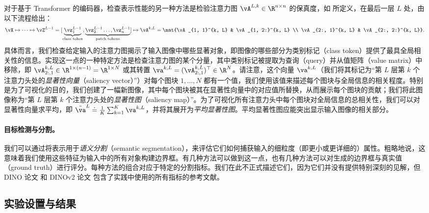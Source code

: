 \documentclass[../../book-main_zh.tex]{subfiles}
\begin{document}
对于基于 Transformer 的编码器，检查表示性能的另一种方法是检验注意力图 \(\vA^{L, k} \in \R^{n \times n}\) 的保真度，如  所定义，在最后一层 \(L\) 处，由以下流程给出：
\begin{align}
\vX \mapsto \cdots \mapsto \vZ^{L - 1} = [\underbrace{\vz_{1}^{L -
    1}}_{\text{class token}}, \underbrace{\vz_{2}^{L - 1} \dots,
\vz_{n}^{L - 1}}_{\text{patch tokens}}] \mapsto \vA^{k, L} =
\mat{\vA_{1, 1}^{k, L} & \vA_{1, 2:}^{k, L} \\ \vA_{2:, 1}^{k, L} &
\vA_{2:, 2:}^{k, L}}.
\end{align}
具体而言，我们检查给定输入的注意力图揭示了输入图像中哪些显著对象，即图像的哪些部分为类别标记（class token）提供了最具全局相关性的信息。实现这一点的一种特定方法是检查注意力图的某个分量，其中类别标记被提取为查询（query）并从值矩阵（value matrix）中移除，即 \(\vA_{2:, 1}^{k, L} \in \R^{1 \times (n - 1)} = \R^{1 \times N}\) 或其转置 \(\va^{k, L} = (\vA_{2:, 1}^{k, L})^{\top} \in \R^{N}\)。请注意，这个向量 \(\va^{k, L}\)（我们将其标记为“第 \(L\) 层第 \(k\) 个注意力头处的\textit{显著性向量}（saliency vector）”）对每个图块 \(1, \dots, N\) 都有一个值，我们使用该值来描述每个图块与全局信息的相关程度。特别是为了可视化的目的，我们创建了一幅新图像，其中每个图块被其在显著性向量中的对应值所替换，从而展示每个图块的贡献；我们将此图像称为“第 \(L\) 层第 \(k\) 个注意力头处的\textit{显著性图}（saliency map）”。为了可视化所有注意力头中每个图块对全局信息的总相关性，我们可以对显著性向量求平均，即 \(\tilde{\va}^{L} \doteq \frac{1}{K}\sum_{k =
1}^{K}\va^{k, L}\)，并将其展开为\textit{平均显著性图}。平均显著性图应能突出显示输入图像的相关部分。

\paragraph{目标检测与分割。}

我们可以通过将表示用于\textit{语义分割}（semantic segmentation），来评估它们如何捕获输入的细粒度（即更小或更详细的）属性。粗略地说，这意味着我们使用这些特征为输入中的所有对象构建边界框。有几种方法可以做到这一点，也有几种方法可以对生成的边界框与真实值（ground truth）进行评分。每种方法的组合对应于特定的分割指标。我们在此不正式描述它们，因为它们并没有提供特别深刻的见解，但 DINO 论文 \citep{caron2021emerging} 和 DINOv2 论文 \citep{oquab2023dinov2} 包含了实践中使用的所有指标的参考文献。

\subsection{实验设置与结果}
\label{sub:contrastive_learning_experiment_results}
\end{document}
